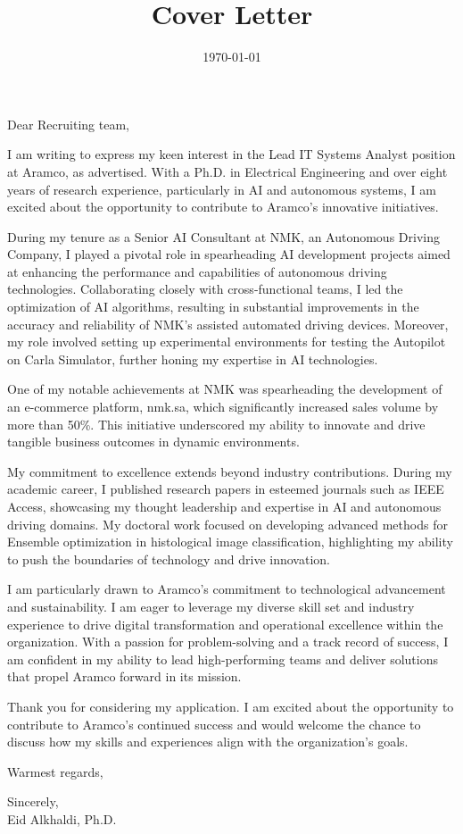 \documentclass[11pt]{article}
\date{\today}
\title{Cover Letter}
\begin{document}
\maketitle
\noindent
Dear Recruiting team,
\indent

I am writing to express my keen interest in the Lead IT Systems Analyst position at Aramco, as advertised. With a Ph.D. in Electrical Engineering and over eight years of research experience, particularly in AI and autonomous systems, I am excited about the opportunity to contribute to Aramco's innovative initiatives.

During my tenure as a Senior AI Consultant at NMK, an Autonomous Driving Company, I played a pivotal role in spearheading AI development projects aimed at enhancing the performance and capabilities of autonomous driving technologies. Collaborating closely with cross-functional teams, I led the optimization of AI algorithms, resulting in substantial improvements in the accuracy and reliability of NMK's assisted automated driving devices. Moreover, my role involved setting up experimental environments for testing the Autopilot on Carla Simulator, further honing my expertise in AI technologies.

One of my notable achievements at NMK was spearheading the development of an e-commerce platform, nmk.sa, which significantly increased sales volume by more than 50\%. This initiative underscored my ability to innovate and drive tangible business outcomes in dynamic environments.

My commitment to excellence extends beyond industry contributions. During my academic career, I published research papers in esteemed journals such as IEEE Access, showcasing my thought leadership and expertise in AI and autonomous driving domains. My doctoral work focused on developing advanced methods for Ensemble optimization in histological image classification, highlighting my ability to push the boundaries of technology and drive innovation.

I am particularly drawn to Aramco's commitment to technological advancement and sustainability. I am eager to leverage my diverse skill set and industry experience to drive digital transformation and operational excellence within the organization. With a passion for problem-solving and a track record of success, I am confident in my ability to lead high-performing teams and deliver solutions that propel Aramco forward in its mission.

Thank you for considering my application. I am excited about the opportunity to contribute to Aramco's continued success and would welcome the chance to discuss how my skills and experiences align with the organization's goals.

Warmest regards,

\noindent
Sincerely,\\[0pt]
Eid Alkhaldi, Ph.D.
\end{document}
